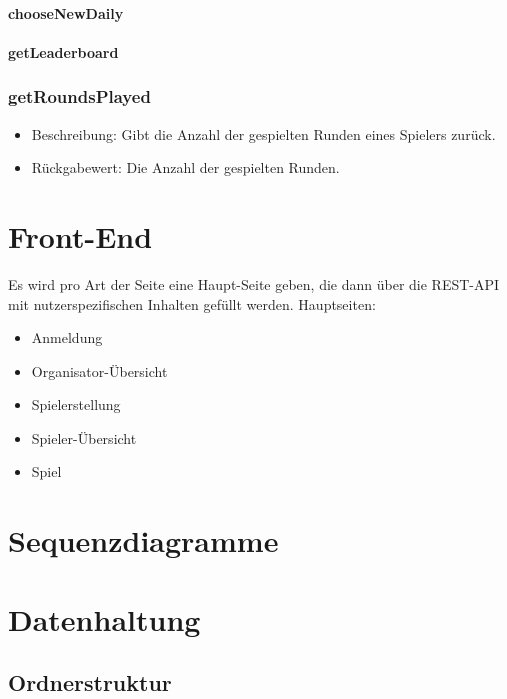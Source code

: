 \documentclass[a4paper]{scrreprt}
\begin{document}
	\subsubsection{chooseNewDaily}
	\subsubsection{getLeaderboard}
	\subsection{getRoundsPlayed}
	\begin{itemize}
		\item Beschreibung: Gibt die Anzahl der gespielten Runden eines Spielers zurück.
		\item Rückgabewert: Die Anzahl der gespielten Runden.
	\end{itemize}
	
	
	
	
	\chapter{Front-End}
	Es wird pro Art der Seite eine Haupt-Seite geben, die dann über die REST-API mit nutzerspezifischen Inhalten gefüllt werden.
	Hauptseiten:
	\begin{itemize}
		\item   Anmeldung
		\item   Organisator-Übersicht
		\item   Spielerstellung
		\item   Spieler-Übersicht
		\item   Spiel
	\end{itemize}
	\chapter{Sequenzdiagramme}
	
	\chapter{Datenhaltung}
	
	\section{Ordnerstruktur}
	
\end{document}
